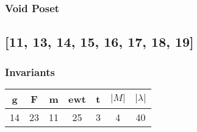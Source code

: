 \documentclass[a4paper]{article}
\begin{document}
\hfill\begin{minipage}{0.48\textwidth}
\subsubsection*{Void Poset}
\centering
{}
\end{minipage}
\newpage\subsection{[11, 13, 14, 15, 16, 17, 18, 19]}
\noindent\begin{minipage}{0.6\textwidth}
\subsubsection*{Invariants}
\centering
\begin{tabular}{|c|c|c|c|c|c|c|}
\toprule
g & F & m & ewt & t & \(|M|\) & \(|\lambda|\) \\
\midrule
14 & 23 & 11 & 25 & 3 & 4 & 40 \\
\bottomrule
\end{tabular}
\end{minipage}%
\end{document}
